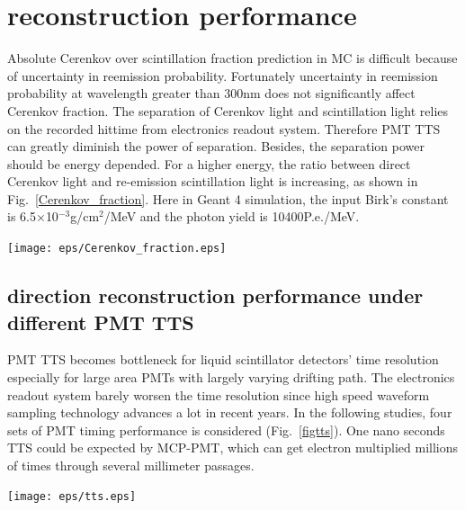 \documentclass[a4paper,10pt]{cpc-hepnp}
\begin{document}
\section{reconstruction performance}
Absolute Cerenkov over scintillation fraction prediction in MC is difficult 
because of uncertainty in reemission probability. Fortunately uncertainty
in reemission probability at wavelength greater than 300nm does not
significantly affect Cerenkov fraction\cite{DocDB9847}. The separation
of Cerenkov light and scintillation light relies on the recorded hittime
from electronics readout system. Therefore PMT TTS can greatly diminish
the power of separation. Besides, the separation power should be energy
depended. For a higher energy, the ratio between direct Cerenkov light
and re-emission scintillation light is increasing, as shown in
Fig.~\ref{Cerenkov_fraction}. Here in Geant 4 simulation, the input
Birk's constant is 6.5$\times$10$^{-3}$g/cm$^{2}$/MeV and the photon yield
is 10400P.e./MeV.
\begin{center}
\texttt{[image: eps/Cerenkov\_fraction.eps]}
\end{center}
\subsection{direction reconstruction performance under different PMT TTS}
PMT TTS becomes bottleneck for liquid scintillator detectors' time resolution
especially for large area PMTs with largely varying drifting path. The
electronics readout system barely worsen the time resolution
since high speed waveform sampling technology advances a lot in
recent years. In the following studies, four sets of PMT timing performance
is considered (Fig.~\ref{figtts}). One nano seconds TTS could be expected by
MCP-PMT, which can get electron multiplied millions of times through several
millimeter passages.
\begin{center}
\texttt{[image: eps/tts.eps]}
\end{center}
\end{document}
